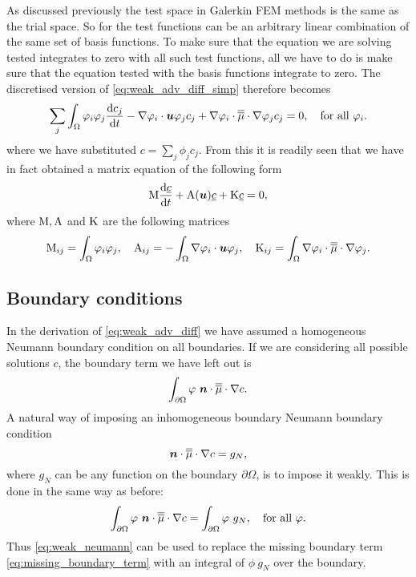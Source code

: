 As discussed previously the test space in Galerkin FEM methods is the same as the 
trial space. So for \PN the test functions can be an arbitrary linear combination 
of the same set of basis functions. To make sure that the equation we are solving 
tested integrates to zero with all such test functions, all we have to do is make sure
that the equation tested with the basis functions integrate to zero. The discretised 
version of \eqref{eq:weak_adv_diff_simp} therefore becomes
\begin{equation}
  \sum_j \int_\Omega \varphi_i \varphi_j  \frac{\mathrm{d} c_j}{\mathrm{d} t} -
    \nabla\varphi_i\cdot{\mbox{\boldmath$u$}}\varphi_j  c_j + 
    \nabla\varphi_i\cdot \overline{\overline{\mu}}\cdot\nabla \varphi_j c_j = 0,
    \quad\text{for all }\varphi_i.
\end{equation}
where we have substituted $c=\sum_j \phi_j c_j$. From this it is readily seen that 
we have in fact obtained a matrix equation of the following form
\begin{equation}
  \mathrm{M} \frac{\mathrm{d}\underline{c}}{\mathrm{d} t}+\mathrm{A}({\mbox{\boldmath$u$}})\underline{c}+\mathrm{K}\underline{c}=0,
  \label{eq:cg_adv_diff_mat}
\end{equation}
where $\mathrm{M}, \mathrm{A}$ and $\mathrm{K}$ are the following matrices
\begin{equation}
  \mathrm{M}_{ij}=\int_\Omega \varphi_i\varphi_j, \quad
  \mathrm{A}_{ij}=-\int_\Omega \nabla\varphi_i\cdot{\mbox{\boldmath$u$}} \varphi_j, \quad
  \mathrm{K}_{ij}=\int_\Omega \nabla\varphi_i\cdot \overline{\overline{\mu}}\cdot\nabla \varphi_j.
\end{equation}

\subsection{Boundary conditions}
In the derivation of \eqref{eq:weak_adv_diff} we have assumed a homogeneous Neumann 
boundary condition on all boundaries. If we are considering all possible 
solutions $c$, the boundary term we have left out is
\begin{equation}\label{eq:missing_boundary_term}
  \int_{\partial\Omega} \varphi~{\mbox{\boldmath$n$}}\cdot\overline{\overline{\mu}}\cdot\nabla c.
\end{equation}
A natural way of imposing an inhomogeneous boundary Neumann boundary condition
\begin{equation*}
  {\mbox{\boldmath$n$}}\cdot\overline{\overline{\mu}}\cdot\nabla c=g_N,
\end{equation*}
where $g_N$ can be any function on the boundary $\partial\Omega$, is to impose it 
weakly. This is done in the same way as before:
\begin{equation}\label{eq:weak_neumann}
  \int_{\partial\Omega} \varphi~{\mbox{\boldmath$n$}}\cdot\overline{\overline{\mu}}\cdot\nabla c=
    \int_{\partial\Omega} \varphi~g_N, \quad \text{for all }\varphi.
\end{equation}
Thus \eqref{eq:weak_neumann} can be used to replace the missing 
boundary term \eqref{eq:missing_boundary_term} with an integral of $\phi~g_N$ 
over the boundary.

